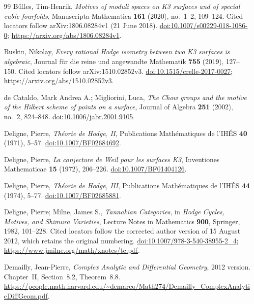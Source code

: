 \documentclass[11pt]{amsart}
\theoremstyle{definition}
\theoremstyle{remark}
\numberwithin{equation}{section}
\begin{document}
\begin{thebibliography}{99}
B{\"u}lles, Tim-Henrik, \emph{Motives of moduli spaces on {K3} surfaces and of special cubic fourfolds}, Manuscripta Mathematica \textbf{161} (2020), no.~1--2, 109--124. Cited locators follow arXiv:1806.08284v1 (21 June 2018). \href{https://doi.org/10.1007/s00229-018-1086-0}{doi:10.1007/s00229-018-1086-0}; \url{https://arxiv.org/abs/1806.08284v1}.

Buskin, Nikolay, \emph{Every rational {Hodge} isometry between two {K3} surfaces is algebraic}, Journal f{\"u}r die reine und angewandte Mathematik \textbf{755} (2019), 127--150. Cited locators follow arXiv:1510.02852v3. \href{https://doi.org/10.1515/crelle-2017-0027}{doi:10.1515/crelle-2017-0027}; \url{https://arxiv.org/abs/1510.02852v3}.

de Cataldo, Mark Andrea A.; Migliorini, Luca, \emph{The {Chow} groups and the motive of the {Hilbert} scheme of points on a surface}, Journal of Algebra \textbf{251} (2002), no.~2, 824--848. \href{https://doi.org/10.1006/jabr.2001.9105}{doi:10.1006/jabr.2001.9105}.

Deligne, Pierre, \emph{Th{\'e}orie de {Hodge}, {II}}, Publications Math{\'e}matiques de l'IH{\'E}S \textbf{40} (1971), 5--57. \href{https://doi.org/10.1007/BF02684692}{doi:10.1007/BF02684692}.

Deligne, Pierre, \emph{La conjecture de {Weil} pour les surfaces {K3}}, Inventiones Mathematicae \textbf{15} (1972), 206--226. \href{https://doi.org/10.1007/BF01404126}{doi:10.1007/BF01404126}.

Deligne, Pierre, \emph{Th{\'e}orie de {Hodge}, {III}}, Publications Math{\'e}matiques de l'IH{\'E}S \textbf{44} (1974), 5--77. \href{https://doi.org/10.1007/BF02685881}{doi:10.1007/BF02685881}.

Deligne, Pierre; Milne, James S., \emph{Tannakian Categories}, in \emph{Hodge Cycles, Motives, and Shimura Varieties}, Lecture Notes in Mathematics \textbf{900}, Springer, 1982, 101--228. Cited locators follow the corrected author version of 15 August 2012, which retains the original numbering. \href{https://doi.org/10.1007/978-3-540-38955-2_4}{doi:10.1007/978-3-540-38955-2\_4}; \url{https://www.jmilne.org/math/xnotes/tc.pdf}.

Demailly, Jean-Pierre, \emph{Complex Analytic and Differential Geometry}, 2012 version. Chapter~II, Section~8.2, Theorem~8.8. \url{https://people.math.harvard.edu/~demarco/Math274/Demailly_ComplexAnalyticDiffGeom.pdf}.


\end{thebibliography}
\end{document}
